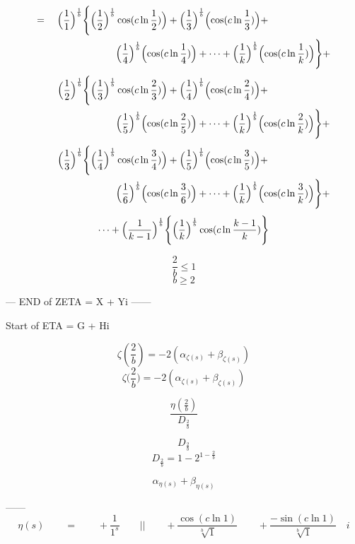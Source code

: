 \documentclass{amsart}
\begin{document}
	\[
	\begin{aligned}
		= \quad \Bigl( \frac{1}{1} \Bigr)^\frac1b \Biggl\{ \Bigl( \frac{1}{2} \Bigr)^\frac1b &\cos(c \ln \frac{1}{2}) \Bigr) + \Bigl( \frac{1}{3} \Bigr)^\frac1b \Bigl( \cos(c \ln \frac{1}{3}) \Bigr) + \\
		& \Bigl( \frac{1}{4} \Bigr)^\frac1b \Bigl( \cos(c \ln \frac{1}{4}) \Bigr) + \dots  + \Bigl( \frac{1}{k} \Bigr)^\frac1b \Bigl( \cos(c \ln \frac{1}{k}) \Bigr) \Biggr\} + 
	\end{aligned}
	\]
	\[
	\begin{aligned}
		\quad\quad \Bigl( \frac{1}{2}  \Bigr)^\frac1b \Biggl\{ \Bigl( \frac{1}{3} \Bigr)^\frac1b &\cos(c \ln \frac{2}{3}) \Bigr) + \Bigl( \frac{1}{4} \Bigr)^\frac1b \Bigl( \cos(c \ln \frac{2}{4}) \Bigr) + \\
		& \Bigl( \frac{1}{5} \Bigr)^\frac1b \Bigl( \cos(c \ln \frac{2}{5}) \Bigr) + \dots  + \Bigl( \frac{1}{k} \Bigr)^\frac1b \Bigl( \cos(c \ln \frac{2}{k}) \Bigr) \Biggr\} + 
	\end{aligned}
	\]
	\[
	\begin{aligned}
		\quad\quad \Bigl( \frac{1}{3} \Bigr)^\frac1b \Biggl\{ \Bigl( \frac{1}{4} \Bigr)^\frac1b &\cos(c \ln \frac{3}{4}) \Bigr) + \Bigl( \frac{1}{5} \Bigr)^\frac1b \Bigl( \cos(c \ln \frac{3}{5}) \Bigr) + \\
		& \Bigl( \frac{1}{6} \Bigr)^\frac1b \Bigl( \cos(c \ln \frac{3}{6}) \Bigr) + \dots  + \Bigl( \frac{1}{k} \Bigr)^\frac1b \Bigl( \cos(c \ln \frac{3}{k}) \Bigr) \Biggr\} + 
	\end{aligned}
	\]
	\[ \dots + \Bigl( \frac{1}{k-1} \Bigr)^\frac1b \Biggl\{ \Bigl( \frac{1}{k} \Bigr)^\frac1b \cos(c \ln \frac{k-1}{k}) \Biggr\} \]
	
	\[ \frac{2}{b} \leq 1 \]
	\[ b \geq 2 \]
	
	
	--- END of ZETA = X + Yi ------
	
	\newpage
	Start of ETA = G + Hi
	
	\[ \zeta(\frac{2}{b}) = -2(\alpha_{\zeta(s)} + \beta_{\zeta(s)}) \]
	\[ \zeta\biggl( \frac{2}{b} \biggr) = -2(\alpha_{\zeta(s)} + \beta_{\zeta(s)}) \]
	
	\[ \frac{\eta( \frac{2}{b} )}{D_{\frac{2}{b}}}  \]
	
	\[ D_{\frac{2}{b}} \]
	\[ D_{\frac{2}{b}} = 1 - 2^{1-\frac{2}{b}} \]
	
	\[ \alpha_{\eta(s)} + \beta_{\eta(s)} \]
	
	------
	\[ \eta(s) \qquad = \qquad +\frac{1}{1^s} \qquad \Big|\Big|  \qquad +\frac{\cos({c\ln 1})}{\sqrt[b]{1}} \qquad +\frac{-\sin({c\ln 1})}{\sqrt[b]{1}} \quad i  \]
	
\end{document}
